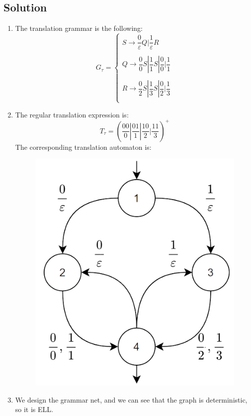 \documentclass[12pt, a4paper]{report}
\begin{document}
    \subsection*{Solution}
        \begin{enumerate}
            \item The translation grammar is the following: 
                \[G_{\tau}=\begin{cases}
                    S \rightarrow \dfrac{0}{\varepsilon}Q|\dfrac{1}{\varepsilon}R     \\
                    \\
                    Q \rightarrow \dfrac{0}{0}S|\dfrac{1}{1}S|\dfrac{0}{0}|\dfrac{1}{1} \\
                    \\
                    R \rightarrow \dfrac{0}{2}S|\dfrac{1}{3}S|\dfrac{0}{2}|\dfrac{1}{3} \\
                \end{cases}\]
            \item The regular translation expression is: 
                \[T_{\tau}=\left( \dfrac{00}{0}|\dfrac{01}{1}| \dfrac{10}{2}|\dfrac{11}{3}\right)^{+}\]
                The corresponding translation automaton is: 
                \begin{figure}[H]
                    \centering
                    \includegraphics[width=0.4\linewidth]{images/gram.png}
                \end{figure} 
            \item We design the grammar net, and we can see that the graph is deterministic, so it is ELL.     
        \end{enumerate}
\end{document}
